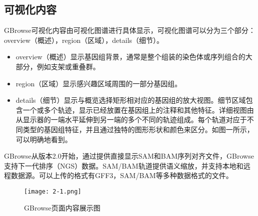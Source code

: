 		\subsection{可视化内容}
		GBrowse可视化内容由可视化图谱进行具体显示，可视化图谱可以分为三个部分：overview（概述），region（区域），details（细节）。
		\begin{itemize}
			\item  overview（概述）显示基因组背景，通常是整个组装的染色体或序列组合的大部分，例如支架或重叠群。
			\item region（区域）显示感兴趣区域周围的一部分基因组。
			\item details（细节）显示与概览选择矩形相对应的基因组的放大视图。细节区域包含一个或多个轨迹，显示已经放置在基因组上的注释和其他特征。详细视图由从显示器的一端水平延伸到另一端的多个不同的轨迹组成。每个轨道对应于不同类型的基因组特征，并且通过独特的图形形状和颜色来区分。如图一所示，可以明确地看到。
		\end{itemize}
	GBrowse从版本2.0开始，通过提供直接显示SAM和BAM序列对齐文件，GBrowse支持下一代排序（NGS）数据。SAM/BAM轨道提供语义缩放，并支持本地和远程数据源。可以上传的格式有GFF3，SAM/BAM等多种数据格式的文件。
		\begin{figure}
			\centering
			\texttt{[image: 2-1.png]}
			\caption{GBrowse页面内容展示图}
		\end{figure}	
